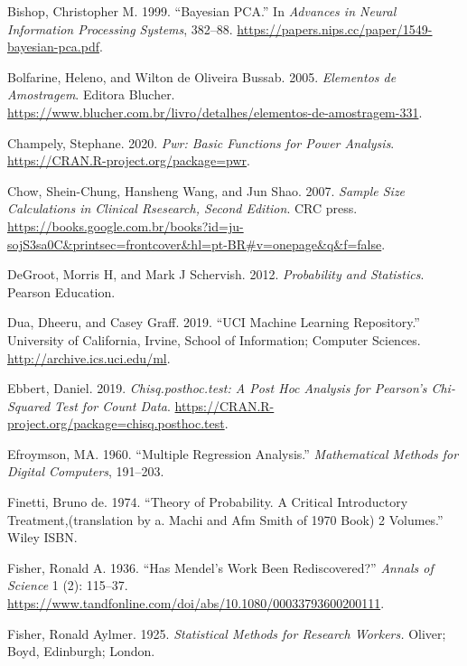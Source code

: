 \documentclass[
]{book}
\newlength{\cslhangindent}
\newenvironment{cslreferences}%
  {\setlength{\parindent}{0pt}%
  \everypar{\setlength{\hangindent}{\cslhangindent}}\ignorespaces}%
  {\par}
\theoremstyle{definition}
\theoremstyle{definition}
\theoremstyle{definition}
\theoremstyle{remark}
\begin{document}
\begin{cslreferences}
\leavevmode\hypertarget{ref-bishop1999bayesian}{}%
Bishop, Christopher M. 1999. ``Bayesian PCA.'' In \emph{Advances in Neural Information Processing Systems}, 382--88. \url{https://papers.nips.cc/paper/1549-bayesian-pca.pdf}.

\leavevmode\hypertarget{ref-bolfarine2005elementos}{}%
Bolfarine, Heleno, and Wilton de Oliveira Bussab. 2005. \emph{Elementos de Amostragem}. Editora Blucher. \url{https://www.blucher.com.br/livro/detalhes/elementos-de-amostragem-331}.

\leavevmode\hypertarget{ref-champely2020pwr}{}%
Champely, Stephane. 2020. \emph{Pwr: Basic Functions for Power Analysis}. \url{https://CRAN.R-project.org/package=pwr}.

\leavevmode\hypertarget{ref-chow2007sample}{}%
Chow, Shein-Chung, Hansheng Wang, and Jun Shao. 2007. \emph{Sample Size Calculations in Clinical Rsesearch, Second Edition}. CRC press. \url{https://books.google.com.br/books?id=ju-sojS3sa0C\&printsec=frontcover\&hl=pt-BR\#v=onepage\&q\&f=false}.

\leavevmode\hypertarget{ref-degroot2012probability}{}%
DeGroot, Morris H, and Mark J Schervish. 2012. \emph{Probability and Statistics}. Pearson Education.

\leavevmode\hypertarget{ref-dua2019uci}{}%
Dua, Dheeru, and Casey Graff. 2019. ``UCI Machine Learning Repository.'' University of California, Irvine, School of Information; Computer Sciences. \url{http://archive.ics.uci.edu/ml}.

\leavevmode\hypertarget{ref-ebbert2019chisq}{}%
Ebbert, Daniel. 2019. \emph{Chisq.posthoc.test: A Post Hoc Analysis for Pearson's Chi-Squared Test for Count Data}. \url{https://CRAN.R-project.org/package=chisq.posthoc.test}.

\leavevmode\hypertarget{ref-efroymson1960multiple}{}%
Efroymson, MA. 1960. ``Multiple Regression Analysis.'' \emph{Mathematical Methods for Digital Computers}, 191--203.

\leavevmode\hypertarget{ref-definetti1974theory}{}%
Finetti, Bruno de. 1974. ``Theory of Probability. A Critical Introductory Treatment,(translation by a. Machi and Afm Smith of 1970 Book) 2 Volumes.'' Wiley ISBN.

\leavevmode\hypertarget{ref-fisher1936has}{}%
Fisher, Ronald A. 1936. ``Has Mendel's Work Been Rediscovered?'' \emph{Annals of Science} 1 (2): 115--37. \url{https://www.tandfonline.com/doi/abs/10.1080/00033793600200111}.

\leavevmode\hypertarget{ref-fisher1925statistical}{}%
Fisher, Ronald Aylmer. 1925. \emph{Statistical Methods for Research Workers.} Oliver; Boyd, Edinburgh; London.


\end{cslreferences}
\end{document}
